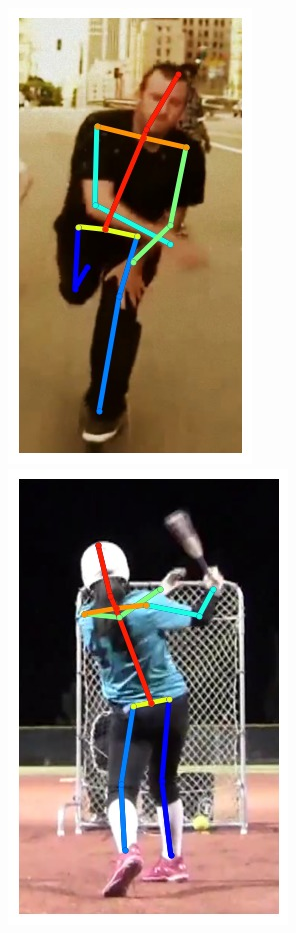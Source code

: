 \begin{figure}[t!]
    \includegraphics[height=\flowh]{Figures/pose/qualitative/pred-5}
    \hfill
    \includegraphics[height=\flowh]{Figures/pose/qualitative/pred-6}
    \hfill

\end{figure}
